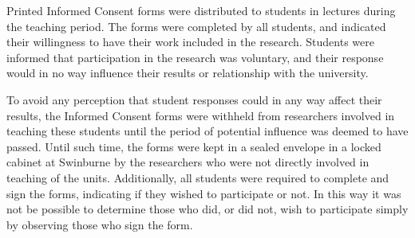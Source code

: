 Printed Informed Consent forms were distributed to students in lectures during the teaching period. The forms were completed by all students, and indicated their willingness to have their work included in the research. Students were informed that participation in the research was voluntary, and their response would in no way influence their results or relationship with the university.

To avoid any perception that student responses could in any way affect their results, the Informed Consent forms were withheld from researchers involved in teaching these students until the period of potential influence was deemed to have passed. Until such time, the forms were kept in a sealed envelope in a locked cabinet at Swinburne by the researchers who were not directly involved in teaching of the units. Additionally, all students were required to complete and sign the forms, indicating if they wished to participate or not. In this way it was not be possible to determine those who did, or did not, wish to participate simply by observing those who sign the form.

